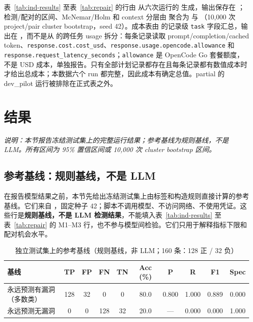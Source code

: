 \documentclass[conference]{IEEEtran}
\begin{document}
表~\ref{tab:ind-results} 至表~\ref{tab:repair} 的行由  从六次运行的  生成，输出保存在 ；检测/配对的区间、McNemar/Holm 和 context 分层由  聚合为  与 （10{,}000 次 project/pair cluster bootstrap，seed 42）。成本表由  的记录级 \texttt{task} 字段汇总，输出在 ，而不是从  的跨任务 usage 拆分：每条记录读取 prompt/completion/cached token、\texttt{response.cost.cost\_usd}、\texttt{response.usage.opencode.allowance} 和 \texttt{response.request\_latency\_seconds}；\texttt{allowance} 是 OpenCode Go 套餐额度，不是 USD 成本，单独报告。只有全部计划记录都存在且每条记录都有数值成本时才给出总成本；本数据六个 run 都完整，因此成本有确定总值。partial 的 dev\_pilot 运行被排除在正式表之外。



\section{结果}
\label{sec:results}

\noindent\textit{说明：本节报告冻结测试集上的完整运行结果；参考基线为规则基线，不是 LLM。所有区间为 95\% 置信区间或 10{,}000 次 cluster bootstrap 区间。}

\subsection{参考基线：规则基线，不是 LLM}
\label{sec:ref-baselines}
在报告模型结果之前，本节先给出冻结测试集上由标签和构造规则直接计算的参考基线。它们来自 ，固定种子 42；脚本不调用模型、不访问网络、不使用凭证。这些行是\textbf{规则基线，不是 LLM 检测结果}，不能填入表~\ref{tab:ind-results} 至表~\ref{tab:repair} 的 M1--M3 行，也不参与模型间检验。它们只用于解释指标下限和配对机会水平。

\begin{table}[t]
\caption{独立测试集上的参考基线（规则基线，非 LLM；160 条：128 正 / 32 负）}
\label{tab:ref-independent}
\centering
\small
\begin{tabular}{@{}lccccccccc@{}}
\toprule
基线 & TP & FP & FN & TN & Acc (\%) & P & R & F1 & Spec\\
\midrule
永远预测有漏洞（多数类） & 128 & 32 & 0 & 0 & 80.0 & 0.800 & 1.000 & 0.889 & 0.000\\
永远预测无漏洞 & 0 & 0 & 128 & 32 & 20.0 & --- & 0.000 & 0.000 & 1.000\\
\bottomrule
\end{tabular}
\end{table}
\end{document}
